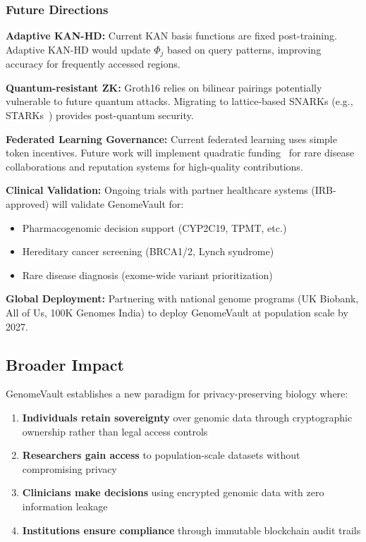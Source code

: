 \documentclass[12pt,a4paper]{article}
\begin{document}
\subsubsection{Future Directions}

\textbf{Adaptive KAN-HD:} Current KAN basis functions are fixed post-training. Adaptive KAN-HD would update $\Phi_j$ based on query patterns, improving accuracy for frequently accessed regions.

\textbf{Quantum-resistant ZK:} Groth16 relies on bilinear pairings potentially vulnerable to future quantum attacks. Migrating to lattice-based SNARKs (e.g., STARKs~\cite{BenSasson2018}) provides post-quantum security.

\textbf{Federated Learning Governance:} Current federated learning uses simple token incentives. Future work will implement quadratic funding~\cite{Buterin2019} for rare disease collaborations and reputation systems for high-quality contributions.

\textbf{Clinical Validation:} Ongoing trials with partner healthcare systems (IRB-approved) will validate GenomeVault for:
\begin{itemize}
\item Pharmacogenomic decision support (CYP2C19, TPMT, etc.)
\item Hereditary cancer screening (BRCA1/2, Lynch syndrome)
\item Rare disease diagnosis (exome-wide variant prioritization)
\end{itemize}

\textbf{Global Deployment:} Partnering with national genome programs (UK Biobank, All of Us, 100K Genomes India) to deploy GenomeVault at population scale by 2027.

\subsection{Broader Impact}

GenomeVault establishes a new paradigm for privacy-preserving biology where:
\begin{enumerate}
\item \textbf{Individuals retain sovereignty} over genomic data through cryptographic ownership rather than legal access controls
\item \textbf{Researchers gain access} to population-scale datasets without compromising privacy
\item \textbf{Clinicians make decisions} using encrypted genomic data with zero information leakage
\item \textbf{Institutions ensure compliance} through immutable blockchain audit trails
\end{enumerate}
\end{document}
